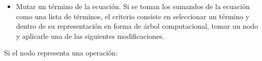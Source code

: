 \begin{itemize}
\begin{center}
\begin{adjustbox}{width=0.35\textwidth, keepaspectratio}
%
              \end{adjustbox}
          \end{center}

    \item Mutar un término de la ecuación. Si se toman los sumandos de la ecuación como una lista de términos, el criterio consiste en seleccionar un término y dentro de su representación en forma de árbol computacional, tomar un nodo y aplicarle una de las siguientes modificaciones.
\end{itemize}

Si el nodo representa una operación:

